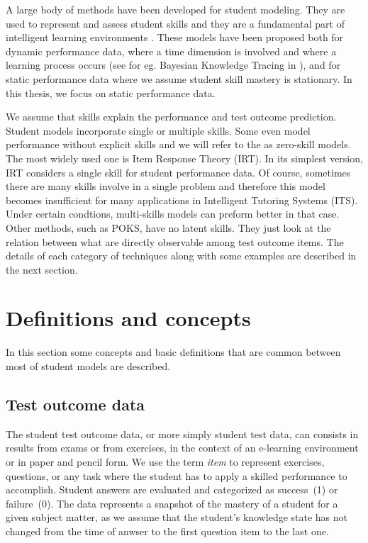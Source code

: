 \label{sec:RevLitt}

A large body of methods have been developed for student modeling.  They are used to represent and assess student skills and they are a fundamental part of intelligent learning environments \citep{Desmarais2011}. These models have been proposed both for dynamic performance data, where a time dimension is involved and where a learning process occurs (see for eg. Bayesian Knowledge Tracing in \citet{Koedinger2011}), and for static performance data where we assume student skill mastery is stationary.  In this thesis, we focus on static performance data.

We assume that skills explain the performance and test outcome prediction. Student models incorporate single or multiple skills.  Some even model performance without explicit skills and we will refer to the as zero-skill models. The most widely used one is Item Response Theory (IRT).  In its simplest version, IRT considers a single skill for student performance data. Of course, sometimes there are many skills involve in a single problem and therefore this model becomes insufficient for many applications in Intelligent Tutoring Systems (ITS). Under certain condtions, multi-skills models can preform better in that case. Other methods, such as POKS, have no latent skills. They just look at the relation between what are directly observable among test outcome items. The details of each category of techniques along with some examples are described in the next section.

\section{Definitions and concepts}

In this section some concepts and basic definitions that are common between most of student models are described. 
 
\subsection{Test outcome data}

The student test outcome data, or more simply student test data, can consists in results from exams or from exercises, in the context of an e-learning environment or in paper and pencil form.  We use the term \textit{item} to represent exercises, questions, or any task where the student has to apply a skilled performance to accomplish.  Student answers are evaluated and categorized as success~(1) or failure~(0).  The data represents a snapshot of the mastery of a student for a given subject matter, as we assume that the student's knowledge state has not changed from the time of anwser to the first question item to the last one.

